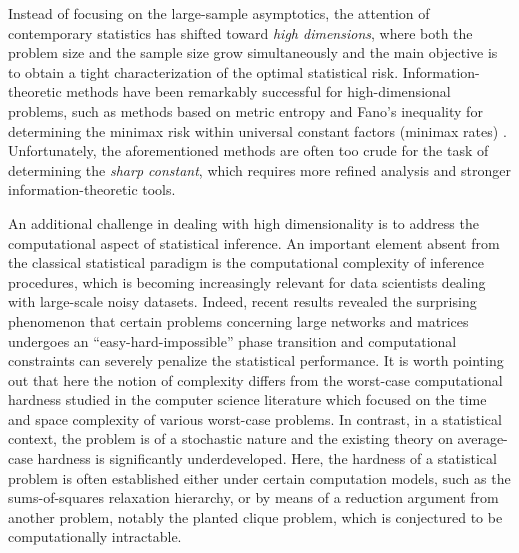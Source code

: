 Instead of focusing on the large-sample asymptotics, the attention of contemporary statistics has shifted toward \emph{high dimensions}, where both the problem size and the sample size grow simultaneously and the main objective is to obtain a tight characterization of the optimal statistical risk. Information-theoretic methods have been remarkably successful for high-dimensional problems, such as methods based on metric entropy and Fano's inequality for determining the minimax risk  within universal constant factors (minimax rates) \cite{YB99}. Unfortunately,  the aforementioned methods are often too crude for the task of determining the \emph{sharp constant}, which requires more refined analysis and stronger information-theoretic tools.

An additional challenge in dealing with high dimensionality is to address the computational aspect of statistical inference. An important element absent from the classical statistical paradigm is the computational complexity of inference procedures, which is becoming increasingly relevant for data scientists dealing with large-scale noisy datasets. Indeed, recent results \cite{berthet2013lowerSparsePCA,ma2013submatrix,HajekWuXu14,wang2016statistical,gao2017sparse,Brennan18}
 revealed the surprising phenomenon that certain problems concerning large networks and matrices undergoes an ``easy-hard-impossible'' phase transition and computational constraints can severely penalize the statistical performance.
It is worth pointing out that here the notion of complexity differs from the worst-case computational hardness studied in the computer science literature which focused on the time and space complexity of various worst-case problems. 
In contrast, in a statistical context, the problem is of a stochastic nature and the existing theory on average-case hardness is significantly underdeveloped. 
Here, the hardness of a statistical problem is often established either under certain computation models, such as the sums-of-squares 
relaxation hierarchy, or by means of a reduction argument from another problem, notably the planted clique problem, which is conjectured to be computationally intractable.  


